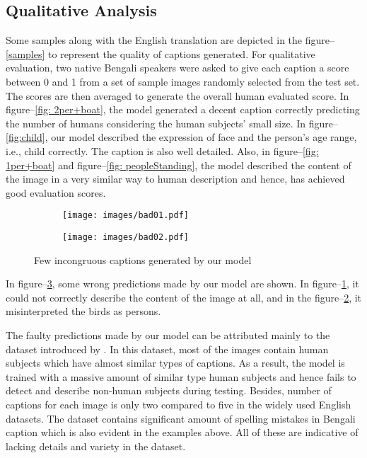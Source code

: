 \documentclass[runningheads]{llncs}
\begin{document}
\subsection{Qualitative Analysis}
Some samples along with the English translation are depicted in the figure--\ref{samples} to represent the quality of captions generated. For qualitative evaluation, two native Bengali speakers were asked to give each caption a score between 0 and 1 from a set of sample images randomly selected from the test set. The scores are then averaged to generate the overall human evaluated score. In figure--\ref{fig: 2per+boat}, the model generated a decent caption correctly predicting the number of humans considering the human subjects' small size. In figure--\ref{fig:child}, our model described the expression of face and the person's age range, i.e., child correctly. The caption is also well detailed. Also, in figure--\ref{fig: 1per+boat} and figure--\ref{fig: peopleStanding}, the model described the content of the image in a very similar way to human description and hence, has achieved good evaluation scores.\begin{figure}[!htbp]
\centering
\begin{subfigure}[b]{\textwidth}
        \texttt{[image: images/bad01.pdf]}
\caption{}
         \label{fig:bad1}
     \end{subfigure}
     \hfill
     \begin{subfigure}[b]{\textwidth}
          \texttt{[image: images/bad02.pdf]}
\caption{}
         \label{fig:bad2}
     \end{subfigure}
        \caption{Few incongruous captions generated by our model}
        \label{bad}
\end{figure}

In figure--\ref{bad}, some wrong predictions made by our model are shown. In figure--\ref{fig:bad1}, it could not correctly describe the content of the image at all, and in the figure--\ref{fig:bad2}, it misinterpreted the birds as persons. 

The faulty predictions made by our model can be attributed mainly to the dataset introduced by \cite{chittron}. In this dataset, most of the images contain human subjects which have almost similar types of captions. As a result, the model is trained with a massive amount of similar type human subjects and hence fails to detect and describe non-human subjects during testing. Besides, number of captions for each image is only two compared to five in the widely used English datasets. The dataset contains significant amount of spelling mistakes in Bengali caption which is also evident in the examples above. All of these are indicative of lacking details and variety in the dataset. 
\end{document}
